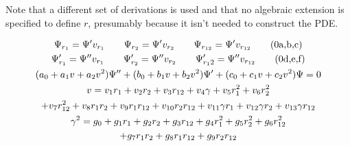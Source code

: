 \documentclass{article}
\theoremstyle{definition}
\theoremstyle{plain}
\begin{document}
Note that a different set of derivations is used and that no algebraic extension is specified to define $r$, presumably
because it isn't needed to construct the PDE.

\begin{subequations}
\label{ansatz 16 plus}
\begin{gather}
\Psi_{r_1} = \Psi' v_{r_1} \qquad
\Psi_{r_2} = \Psi' v_{r_2} \qquad
\Psi_{r_{12}} = \Psi' v_{r_{12}} \stepcounter{equation}\stepcounter{equation}\stepcounter{equation}\tag{\arabic{parentequation}a,b,c} \\
\Psi'_{r_1} = \Psi'' v_{r_1} \qquad
\Psi'_{r_2} = \Psi'' v_{r_2} \qquad
\Psi'_{r_12} = \Psi'' v_{r_{12}} \stepcounter{equation}\stepcounter{equation}\stepcounter{equation}\tag{\arabic{parentequation}d,e,f} \\
(a_0 + a_1 v + a_2 v^2) \Psi'' + (b_0 + b_1 v + b_2 v^2) \Psi' + (c_0 + c_1 v + c_2 v^2) \Psi = 0 \label{ansatz 16 plus:1} \\
v = v_1 r_1 + v_2 r_2 + v_3 r_{12} + v_4 \gamma + v_5 r_1^2 + v_6 r_2^2 \nonumber\\
+ v_7 r_{12}^2 + v_8 r_1 r_2 + v_9 r_1 r_{12} + v_{10} r_2 r_{12} + v_{11} \gamma r_1 + v_{12} \gamma r_2 + v_{13} \gamma r_{12} \label{ansatz 16 plus:2} \\
\gamma^2 = g_0 + g_1 r_1 + g_2 r_2 + g_3 r_{12} + g_4 r_1^2 + g_5 r_2^2 + g_6 r_{12}^2 \nonumber\\
+ g_7 r_1 r_2 + g_8 r_1 r_{12} + g_9 r_2 r_{12} \label{ansatz 16 plus:3}
\end{gather}
\end{subequations}

\vfill\eject
\end{document}
